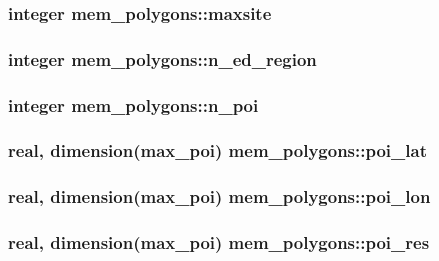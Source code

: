 \subsubsection[{maxsite}]{\setlength{\rightskip}{0pt plus 5cm}integer mem\+\_\+polygons\+::maxsite}\label{namespacemem__polygons_a6ea7e4cae77c3cdabf5313950a022aa1}
\hypertarget{namespacemem__polygons_aff9e65847e5c49e661181c4eaeee87f9}{}
\subsubsection[{n\+\_\+ed\+\_\+region}]{\setlength{\rightskip}{0pt plus 5cm}integer mem\+\_\+polygons\+::n\+\_\+ed\+\_\+region}\label{namespacemem__polygons_aff9e65847e5c49e661181c4eaeee87f9}
\hypertarget{namespacemem__polygons_a40cfdce95dfd1bde88dfdc7e2aa9c667}{}
\subsubsection[{n\+\_\+poi}]{\setlength{\rightskip}{0pt plus 5cm}integer mem\+\_\+polygons\+::n\+\_\+poi}\label{namespacemem__polygons_a40cfdce95dfd1bde88dfdc7e2aa9c667}
\hypertarget{namespacemem__polygons_acf0a86c4cebdaacd2344c2af339605a3}{}
\subsubsection[{poi\+\_\+lat}]{\setlength{\rightskip}{0pt plus 5cm}real, dimension(max\+\_\+poi) mem\+\_\+polygons\+::poi\+\_\+lat}\label{namespacemem__polygons_acf0a86c4cebdaacd2344c2af339605a3}
\hypertarget{namespacemem__polygons_aa70b00dd2ead0ce3911b4d7bed6e5212}{}
\subsubsection[{poi\+\_\+lon}]{\setlength{\rightskip}{0pt plus 5cm}real, dimension(max\+\_\+poi) mem\+\_\+polygons\+::poi\+\_\+lon}\label{namespacemem__polygons_aa70b00dd2ead0ce3911b4d7bed6e5212}
\hypertarget{namespacemem__polygons_abc1cd4ebde7513a27a637c90ac77477a}{}
\subsubsection[{poi\+\_\+res}]{\setlength{\rightskip}{0pt plus 5cm}real, dimension(max\+\_\+poi) mem\+\_\+polygons\+::poi\+\_\+res}\label{namespacemem__polygons_abc1cd4ebde7513a27a637c90ac77477a}
